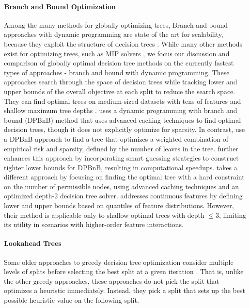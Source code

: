 \paragraph{Branch and Bound Optimization}\label{sec:bnb}
Among the many methods for globally optimizing trees, Branch-and-bound approaches with dynamic programming are state of the art for scalability, because they exploit the structure of decision trees 
\citep{costa2023recent, gosdt, murtree, gosdt_guesses, dl85}. While many other methods exist for optimizing trees, such as MIP solvers \citep{bertsimas2017optimal, verwer2019learning}, we focus our discussion and comparison of globally optimal decision tree methods on the currently fastest types of approaches - branch and bound with dynamic programming. 
These approaches search through the space of decision trees while tracking lower and upper bounds of the overall objective at each split to reduce the search space. 
They can find optimal trees on medium-sized datasets with tens of features and shallow maximum tree depths \citep{maptree, dl85, gosdt, murtree}. \citet{dl85} uses a dynamic programming with branch and bound (DPBnB) method that uses advanced caching techniques to find optimal decision trees, though it does not explicitly optimize for sparsity. In contrast, \citet{gosdt,osdt} use a DPBnB approach to find a tree that optimizes a weighted combination of empirical risk and sparsity, defined by the number of leaves in the tree. \citet{gosdt_guesses} further enhances this approach by incorporating smart guessing strategies to construct tighter lower bounds for DPBnB, resulting in computational speedups. \citet{murtree} takes a different approach by focusing on finding the optimal tree with a hard constraint on the number of permissible nodes, using advanced caching techniques and an optimized depth-2 decision tree solver. \citet{quantbnb} addresses continuous features by defining lower and upper bounds based on quantiles of feature distributions. However, their method is applicable only to shallow optimal trees with depth $\leq 3$, limiting its utility in scenarios with higher-order feature interactions. 

\paragraph{Lookahead Trees}

Some older approaches to greedy decision tree optimization consider multiple levels of splits before selecting the best split at a given iteration
\citep{Norton1989GeneratingBD}. 
That is, unlike the other greedy approaches, these approaches do not pick the split that optimizes a heuristic immediately. Instead, they pick a split that sets up the best possible heuristic value on the following split.

